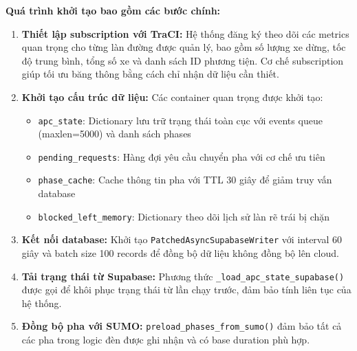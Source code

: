 \textbf{Quá trình khởi tạo bao gồm các bước chính:}

\begin{enumerate}
    \item \textbf{Thiết lập subscription với TraCI:} Hệ thống đăng ký theo dõi các metrics quan trọng cho từng làn đường được quản lý, bao gồm số lượng xe dừng, tốc độ trung bình, tổng số xe và danh sách ID phương tiện. Cơ chế subscription giúp tối ưu băng thông bằng cách chỉ nhận dữ liệu cần thiết.
    
    \item \textbf{Khởi tạo cấu trúc dữ liệu:} Các container quan trọng được khởi tạo:
    \begin{itemize}
        \item \texttt{apc\_state}: Dictionary lưu trữ trạng thái toàn cục với events queue (maxlen=5000) và danh sách phases
        \item \texttt{pending\_requests}: Hàng đợi yêu cầu chuyển pha với cơ chế ưu tiên
        \item \texttt{phase\_cache}: Cache thông tin pha với TTL 30 giây để giảm truy vấn database
        \item \texttt{blocked\_left\_memory}: Dictionary theo dõi lịch sử làn rẽ trái bị chặn
    \end{itemize}
    
    \item \textbf{Kết nối database:} Khởi tạo \texttt{PatchedAsyncSupabaseWriter} với interval 60 giây và batch size 100 records để đồng bộ dữ liệu không đồng bộ lên cloud.
    
    \item \textbf{Tải trạng thái từ Supabase:} Phương thức \texttt{\_load\_apc\_state\_supabase()} được gọi để khôi phục trạng thái từ lần chạy trước, đảm bảo tính liên tục của hệ thống.
    
    \item \textbf{Đồng bộ pha với SUMO:} \texttt{preload\_phases\_from\_sumo()} đảm bảo tất cả các pha trong logic đèn được ghi nhận và có base duration phù hợp.
\end{enumerate}
